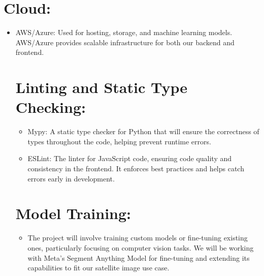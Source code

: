 \documentclass{article}
\begin{document}
  \section{Cloud:}
  \begin{itemize}
      \item AWS/Azure: Used for hosting, storage, and machine learning models. AWS/Azure provides scalable infrastructure for both our backend and frontend.

  \section{Linting and Static Type Checking:}
  \begin{itemize}
    \item Mypy: A static type checker for Python that will ensure the correctness of types throughout the code, helping prevent runtime errors.
    \item ESLint: The linter for JavaScript code, ensuring code quality and consistency in the frontend. It enforces best practices and helps catch errors early in development.
  \end{itemize}

   \section{Model Training:}
  \begin{itemize}
      \item The project will involve training custom models or fine-tuning existing ones, particularly focusing on computer vision tasks. We will be working with Meta’s Segment Anything Model for fine-tuning and extending its capabilities to fit our satellite image use case.

  \end{itemize}
  




\end{itemize}
\end{document}
